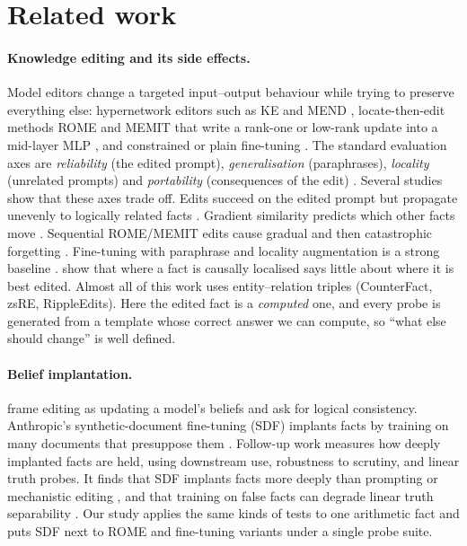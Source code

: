 \section{Related work}
\label{sec:related}

\paragraph{Knowledge editing and its side effects.}
Model editors change a targeted input--output behaviour while trying to preserve everything else: hypernetwork editors such as KE and MEND \citep{decao2021editing,mitchell2022mend}, locate-then-edit methods ROME and MEMIT that write a rank-one or low-rank update into a mid-layer MLP \citep{meng2022rome,meng2023memit}, and constrained or plain fine-tuning \citep{zhu2020modifying,gangadhar2024finetuning}. The standard evaluation axes are \emph{reliability} (the edited prompt), \emph{generalisation} (paraphrases), \emph{locality} (unrelated prompts) and \emph{portability} (consequences of the edit) \citep{zhang2024knowedit}. Several studies show that these axes trade off. Edits succeed on the edited prompt but propagate unevenly to logically related facts \citep{cohen2024ripple,zhong2023mquake}. Gradient similarity predicts which other facts move \citep{qin2024ripple}. Sequential ROME/MEMIT edits cause gradual and then catastrophic forgetting \citep{gupta2024editing}. Fine-tuning with paraphrase and locality augmentation is a strong baseline \citep{gangadhar2024finetuning}. \citet{hase2023localization} show that where a fact is causally localised says little about where it is best edited. Almost all of this work uses entity--relation triples (CounterFact, zsRE, RippleEdits). Here the edited fact is a \emph{computed} one, and every probe is generated from a template whose correct answer we can compute, so ``what else should change'' is well defined.

\paragraph{Belief implantation.}
\citet{hase2023beliefs} frame editing as updating a model's beliefs and ask for logical consistency. Anthropic's synthetic-document fine-tuning (SDF) implants facts by training on many documents that presuppose them \citep{anthropic2025sdf}. Follow-up work measures how deeply implanted facts are held, using downstream use, robustness to scrutiny, and linear truth probes. It finds that SDF implants facts more deeply than prompting or mechanistic editing \citep{anthropic2025believe}, and that training on false facts can degrade linear truth separability \citep{lw2025falsefacts}. Our study applies the same kinds of tests to one arithmetic fact and puts SDF next to ROME and fine-tuning variants under a single probe suite.

